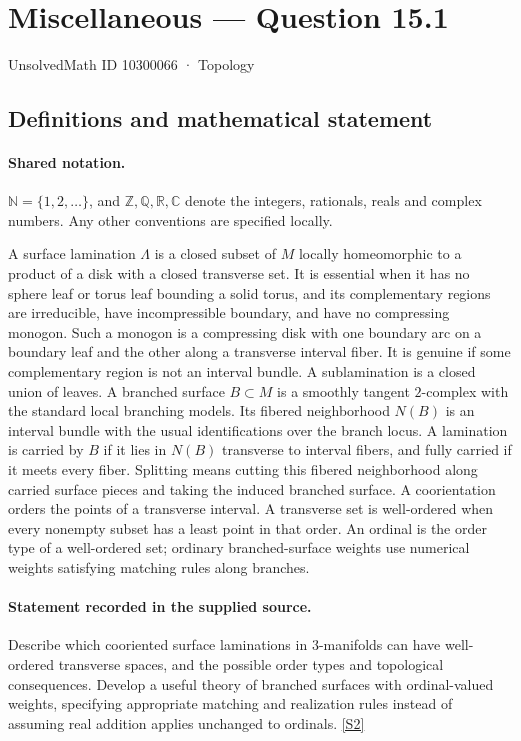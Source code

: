 \documentclass[11pt]{article}
\newcommand{\sref}[2]{\hyperlink{source:#1:#2}{[S#2]}}
\begin{document}
\setcounter{section}{10300065}
\section{Miscellaneous — Question 15.1}\label{10300066}
{\small\sffamily UnsolvedMath ID 10300066 · Topology}
\subsection{Definitions and mathematical statement}

\paragraph{Shared notation.}$\mathbb N=\{1,2,\ldots\}$, and $\mathbb Z,\mathbb Q,\mathbb R,\mathbb C$ denote the integers, rationals, reals and complex numbers. Any other conventions are specified locally.


A surface lamination $\Lambda$ is a closed subset of $M$ locally homeomorphic to a product of a disk with a closed transverse set. It is essential when it has no sphere leaf or torus leaf bounding a solid torus, and its complementary regions are irreducible, have incompressible boundary, and have no compressing monogon. Such a monogon is a compressing disk with one boundary arc on a boundary leaf and the other along a transverse interval fiber. It is genuine if some complementary region is not an interval bundle. A sublamination is a closed union of leaves. A branched surface $B\subset M$ is a smoothly tangent $2$-complex with the standard local branching models. Its fibered neighborhood $N(B)$ is an interval bundle with the usual identifications over the branch locus. A lamination is carried by $B$ if it lies in $N(B)$ transverse to interval fibers, and fully carried if it meets every fiber. Splitting means cutting this fibered neighborhood along carried surface pieces and taking the induced branched surface. A coorientation orders the points of a transverse interval. A transverse set is well-ordered when every nonempty subset has a least point in that order. An ordinal is the order type of a well-ordered set; ordinary branched-surface weights use numerical weights satisfying matching rules along branches.
\paragraph{Statement recorded in the supplied source.}
Describe which cooriented surface laminations in $3$-manifolds can have well-ordered transverse spaces, and the possible order types and topological consequences. Develop a useful theory of branched surfaces with ordinal-valued weights, specifying appropriate matching and realization rules instead of assuming real addition applies unchanged to ordinals. \sref{10300066}{2}
\end{document}
